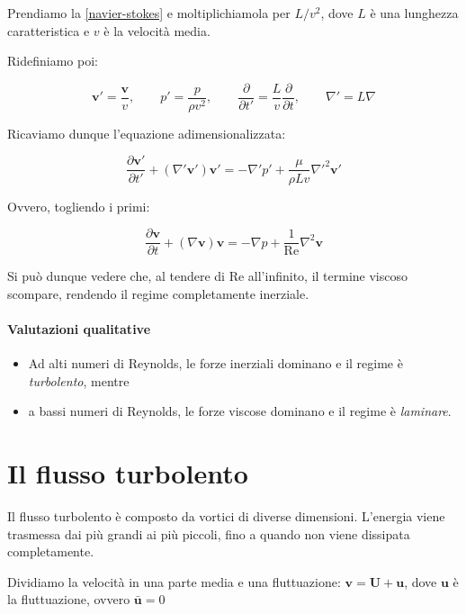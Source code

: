 \documentclass[12pt,a4paper]{article}
\numberwithin{equation}{subsection}
\begin{document}
Prendiamo la \ref{navier-stokes} e moltiplichiamola per $L/v^2$, dove $L$ è una lunghezza caratteristica e $v$ è la velocità media.

Ridefiniamo poi: 

\begin{equation}
\mathbf{v'} = \frac{\mathbf{v}}{v},\qquad p' = \frac{p}{\rho v^2},\qquad \frac{\partial}{\partial t'} = \frac{L}{v} \frac{\partial}{\partial t},\qquad \nabla' = L \nabla
\end{equation}

Ricaviamo dunque l'equazione adimensionalizzata: 

\begin{equation}
\frac{\partial \mathbf{v'}}{\partial t'} + (\nabla' \mathbf{v'}) \mathbf{v'} = -\nabla' p' + \frac{\mu}{\rho L v} \nabla'^2 \mathbf{v'}
\end{equation}

Ovvero, togliendo i primi:

\begin{equation}
\frac{\partial \mathbf{v}}{\partial t} + (\nabla \mathbf{v}) \mathbf{v} = -\nabla p + \frac{1}{\text{Re}} \nabla^2 \mathbf{v}
\end{equation}

Si può dunque vedere che, al tendere di Re all'infinito, il termine viscoso scompare, rendendo il regime completamente inerziale.

\paragraph{Valutazioni qualitative}

\begin{itemize}
\item Ad alti numeri di Reynolds, le forze inerziali dominano e il regime è \emph{turbolento}, mentre
\item a bassi numeri di Reynolds, le forze viscose dominano e il regime è \emph{laminare}.
\end{itemize}

\section{Il flusso turbolento}

Il flusso turbolento è composto da vortici di diverse dimensioni. L'energia viene trasmessa dai più grandi ai più piccoli, fino a quando non viene dissipata completamente.

Dividiamo la velocità in una parte media e una fluttuazione: $\mathbf{v} = \mathbf{U} + \mathbf{u}$, dove $\mathbf{u}$ è la fluttuazione, ovvero $\mathbf{\bar{u}} = 0$
\end{document}
